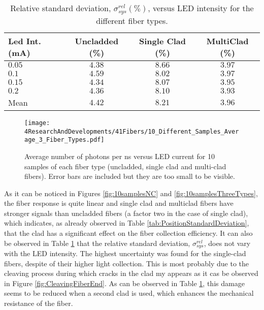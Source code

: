 \begin{table}[h]
\centering{}%
\begin{tabular}{lccc}
\toprule 
Led Int. (mA) & Uncladded (\%) & Single Clad (\%) & MultiClad (\%) \tabularnewline
\midrule
\midrule 
$0.05$ & $4.38$ & $8.66$ & $3.97$ \tabularnewline
$0.1$ & $4.59$ & $8.02$ & $3.97$ \tabularnewline
$0.15$ & $4.34$ & $8.07$ & $3.95$ \tabularnewline
$0.2$ & $4.36$ & $8.10$ & $3.93$ \tabularnewline
\midrule 
Mean & $4.42$ & $8.21$ & $3.96$ \tabularnewline
\bottomrule
\end{tabular}
\caption{Relative standard deviation, $\sigma^{rel}_{sys}(\%)$, versus LED intensity for the different fiber types.}
\label{tab:RelativeStandardDeviation3FiberTypes}
\end{table}

\begin{figure}[h]
\centering
\texttt{[image: 4ResearchAndDevelopments/41Fibers/10\_Different\_Samples\_Average\_3\_Fiber\_Types.pdf]}
\caption{Average number of photons per ns versus LED current for 10 samples of each fiber type (uncladded, single clad and multi-clad fibers). Error bars are included but they are too small to be visible.\label{fig:AveregeThreeFiberTypes}}
\end{figure}

As it can be noticed in Figures \ref{fig:10samplesNC} and \ref{fig:10samplesThreeTypes}, the fiber response is quite linear and single clad and multiclad fibers have stronger signals than uncladded fibers (a factor two in the case of single clad), which indicates, as already observed in Table \ref{tab:PositionStandardDeviation}, that the clad has a significant effect on the fiber collection efficiency. It can also be observed in Table \ref{tab:RelativeStandardDeviation3FiberTypes} that the relative standard deviation, $\sigma^{rel}_{sys}$, does not vary with the LED intensity. The highest uncertainty was found for the single-clad fibers, despite of their higher light collection. This is most probably due to the cleaving process during which cracks in the clad my appears as it cas be observed in Figure \ref{fig:CleavingFiberEnd}. As can be observed in Table \ref{tab:RelativeStandardDeviation3FiberTypes}, this damage seems to be reduced when a second clad is used, which enhances the mechanical resistance of the fiber.


